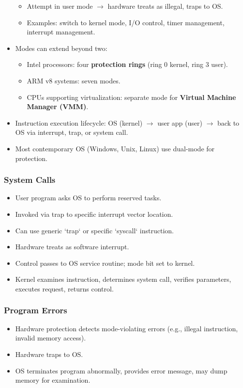 \documentclass{article}
\begin{document}
\begin{itemize}
    \begin{itemize}
        \item Attempt in user mode $\rightarrow$ hardware treats as illegal, traps to OS.
        \item Examples: switch to kernel mode, I/O control, timer management, interrupt management.
    \end{itemize}
    \item Modes can extend beyond two:
    \begin{itemize}
        \item Intel processors: four \textbf{protection rings} (ring 0 kernel, ring 3 user).
        \item ARM v8 systems: seven modes.
        \item CPUs supporting virtualization: separate mode for \textbf{Virtual Machine Manager (VMM)}.
    \end{itemize}
    \item Instruction execution lifecycle: OS (kernel) $\rightarrow$ user app (user) $\rightarrow$ back to OS via interrupt, trap, or system call.
    \item Most contemporary OS (Windows, Unix, Linux) use dual-mode for protection.
\end{itemize}

\subsubsection*{System Calls}
\begin{itemize}
    \item User program asks OS to perform reserved tasks.
    \item Invoked via trap to specific interrupt vector location.
    \item Can use generic `trap` or specific `syscall` instruction.
    \item Hardware treats as software interrupt.
    \item Control passes to OS service routine; mode bit set to kernel.
    \item Kernel examines instruction, determines system call, verifies parameters, executes request, returns control.
\end{itemize}

\subsubsection*{Program Errors}
\begin{itemize}
    \item Hardware protection detects mode-violating errors (e.g., illegal instruction, invalid memory access).
    \item Hardware traps to OS.
    \item OS terminates program abnormally, provides error message, may dump memory for examination.
\end{itemize}
\end{document}

